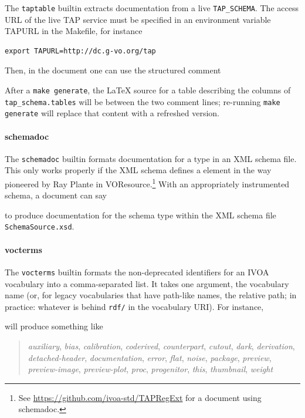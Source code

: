 \documentclass[11pt,a4paper]{ivoa}
\begin{document}
The \texttt{taptable} builtin extracts documentation from a
live \texttt{TAP\_SCHEMA}.  The access URL of the
live TAP service must be specified in an environment variable TAPURL in
the Makefile, for instance

\begin{lstlisting}
export TAPURL=http://dc.g-vo.org/tap
\end{lstlisting}

Then, in the document one can use the structured comment



After a \texttt{make generate}, the LaTeX source for a table describing
the columns of \texttt{tap\_schema.tables} will be between the two
comment lines; re-running \texttt{make generate} will replace that
content with a refreshed version.

\paragraph{schemadoc}

The \texttt{schemadoc} builtin formats
documentation for a type in an XML schema file.  This only works
properly if the XML schema defines a  element in
the way pioneered by Ray Plante in
VOResource.\footnote{See
\url{https://github.com/ivoa-std/TAPRegExt} for a document using
schemadoc.}
With an appropriately instrumented schema, a document can say

to produce documentation for the schema type  within
the XML schema file \texttt{SchemaSource.xsd}.

\paragraph{vocterms}

The \texttt{vocterms} builtin formats the non-deprecated identifiers for
an IVOA vocabulary \citep{2021ivoa.spec.0525D} into a comma-separated
list.  It takes one argument, the vocabulary name (or, for legacy
vocabularies that have path-like names, the relative path; in practice:
whatever is behind \texttt{rdf/} in the vocabulary URI).  For instance,



will produce something like

\begin{quotation}
\noindent
\textsl{auxiliary},
\textsl{bias},
\textsl{calibration},
\textsl{coderived},
\textsl{counterpart},
\textsl{cutout},
\textsl{dark},
\textsl{derivation},
\textsl{detached-header},
\textsl{documentation},
\textsl{error},
\textsl{flat},
\textsl{noise},
\textsl{package},
\textsl{preview},
\textsl{preview-image},
\textsl{preview-plot},
\textsl{proc},
\textsl{progenitor},
\textsl{this},
\textsl{thumbnail},
\textsl{weight}
\end{quotation}
\end{document}
